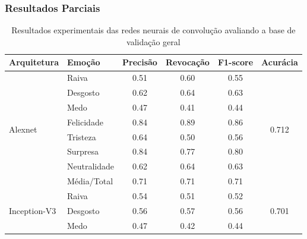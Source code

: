 \documentclass{beamer}
\begin{document}
\begin{frame}
 \frametitle{Resultados Parciais}
\begin{table}[]
\tiny
\centering
\caption{Resultados experimentais das redes neurais de convolução avaliando a base de validação geral}
\label{table:resultsexp}
\begin{tabular}{llcccc}
\hline
\textbf{Arquitetura}                & \textbf{Emoção}       & \textbf{Precisão} & \textbf{Revocação} & \textbf{F1-score} & \textbf{Acurácia}               \\ \hline
\multirow{8}{*}{Alexnet}            & Raiva                 & 0.51              & 0.60               & 0.55              & \multirow{8}{*}{0.712}          \\
                                    & Desgosto              & 0.62              & 0.64               & 0.63              &                                 \\
                                    & Medo                  & 0.47              & 0.41               & 0.44              &                                 \\
                                    & Felicidade            & 0.84              & 0.89               & 0.86              &                                 \\
                                    & Tristeza              & 0.64              & 0.50               & 0.56              &                                 \\
                                    & Surpresa              & 0.84              & 0.77               & 0.80              &                                 \\
                                    & Neutralidade          & 0.62              & 0.64               & 0.63              &                                 \\
                                    & Média/Total           & 0.71              & 0.71               & 0.71              &                                 \\ \hline
\multirow{8}{*}{Inception-V3}       & Raiva                 & 0.54              & 0.51               & 0.52              & \multirow{8}{*}{0.701}          \\
                                    & Desgosto              & 0.56              & 0.57               & 0.56              &                                 \\
                                    & Medo                  & 0.47              & 0.42               & 0.44              &                                 \\

\end{tabular}
\end{table}
\end{frame}
\end{document}
